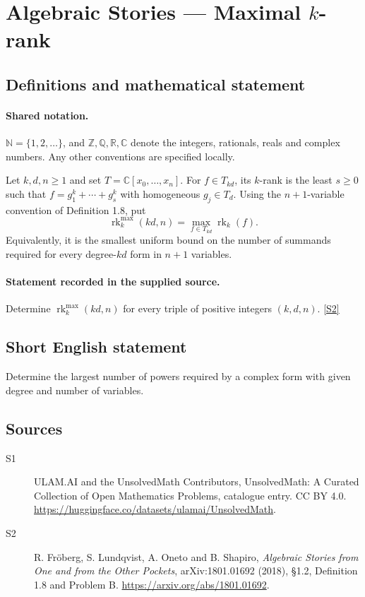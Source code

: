 \documentclass[11pt]{article}
\newcommand{\sref}[2]{\hyperlink{source:#1:#2}{[S#2]}}
\begin{document}
\section{Algebraic Stories — Maximal $k$-rank}\label{statement}

\subsection{Definitions and mathematical statement}

\paragraph{Shared notation.}$\mathbb N=\{1,2,\ldots\}$, and $\mathbb Z,\mathbb Q,\mathbb R,\mathbb C$ denote the integers, rationals, reals and complex numbers. Any other conventions are specified locally.


Let $k,d,n\geq1$ and set $T=\mathbb C[x_0,\ldots,x_n]$. For $f\in T_{kd}$, its $k$-rank is the least $s\geq0$ such that $f=g_1^k+\cdots+g_s^k$ with homogeneous $g_j\in T_d$. Using the $n+1$-variable convention of Definition 1.8, put
\[\operatorname{rk}^{\max}_k(kd,n)=\max_{f\in T_{kd}}\operatorname{rk}_k(f).
\]
Equivalently, it is the smallest uniform bound on the number of summands required for every degree-$kd$ form in $n+1$ variables.
\paragraph{Statement recorded in the supplied source.}
Determine $\operatorname{rk}^{\max}_k(kd,n)$ for every triple of positive integers $(k,d,n)$. \sref{statement}{2}
\subsection{Short English statement}
Determine the largest number of powers required by a complex form with given degree and number of variables.
\subsection{Sources}
\begin{description}
\item[\hypertarget{source:statement:1}{S1}] ULAM.AI and the UnsolvedMath Contributors, UnsolvedMath: A Curated Collection of Open Mathematics Problems, catalogue entry. CC BY 4.0. \url{https://huggingface.co/datasets/ulamai/UnsolvedMath}.
\item[\hypertarget{source:statement:2}{S2}] R. Fröberg, S. Lundqvist, A. Oneto and B. Shapiro, \emph{Algebraic Stories from One and from the Other Pockets}, arXiv:1801.01692 (2018), §1.2, Definition 1.8 and Problem B. \url{https://arxiv.org/abs/1801.01692}.
\end{description}
\label{end:statement}
\end{document}
